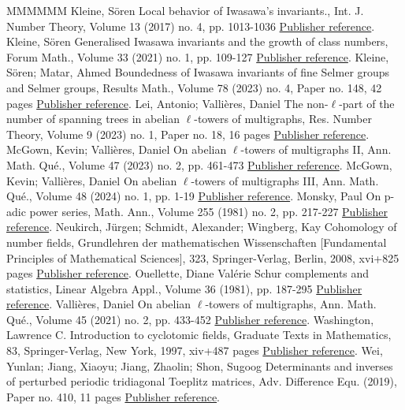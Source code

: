 \documentclass[11pt]{article}
\theoremstyle{definition}
\numberwithin{equation}{section}
\begin{document}
\begin{thebibliography}{MMMMMM}
 Kleine, Sören Local behavior of Iwasawa’s invariants., Int. J. Number Theory, Volume 13 (2017) no. 4, pp. 1013-1036 \href{https://alco.centre-mersenne.org/articles/10.5802/alco.366/#local_beh}{Publisher reference}.
 Kleine, Sören Generalised Iwasawa invariants and the growth of class numbers, Forum Math., Volume 33 (2021) no. 1, pp. 109-127 \href{https://alco.centre-mersenne.org/articles/10.5802/alco.366/#local_max}{Publisher reference}.
 Kleine, Sören; Matar, Ahmed Boundedness of Iwasawa invariants of fine Selmer groups and Selmer groups, Results Math., Volume 78 (2023) no. 4, Paper no. 148, 42 pages \href{https://alco.centre-mersenne.org/articles/10.5802/alco.366/#kleine-matar}{Publisher reference}.
 Lei, Antonio; Vallières, Daniel The non-\(\ell\)-part of the number of spanning trees in abelian \(\ell\)-towers of multigraphs, Res. Number Theory, Volume 9 (2023) no. 1, Paper no. 18, 16 pages \href{https://alco.centre-mersenne.org/articles/10.5802/alco.366/#vallieres-lei}{Publisher reference}.
 McGown, Kevin; Vallières, Daniel On abelian \(\ell\)-towers of multigraphs II, Ann. Math. Qué., Volume 47 (2023) no. 2, pp. 461-473 \href{https://alco.centre-mersenne.org/articles/10.5802/alco.366/#vallieres2}{Publisher reference}.
 McGown, Kevin; Vallières, Daniel On abelian \(\ell\)-towers of multigraphs III, Ann. Math. Qué., Volume 48 (2024) no. 1, pp. 1-19 \href{https://alco.centre-mersenne.org/articles/10.5802/alco.366/#vallieres3}{Publisher reference}.
 Monsky, Paul On p-adic power series, Math. Ann., Volume 255 (1981) no. 2, pp. 217-227 \href{https://alco.centre-mersenne.org/articles/10.5802/alco.366/#monsky}{Publisher reference}.
 Neukirch, Jürgen; Schmidt, Alexander; Wingberg, Kay Cohomology of number fields, Grundlehren der mathematischen Wissenschaften [Fundamental Principles of Mathematical Sciences], 323, Springer-Verlag, Berlin, 2008, xvi+825 pages \href{https://alco.centre-mersenne.org/articles/10.5802/alco.366/#nsw}{Publisher reference}.
 Ouellette, Diane Valérie Schur complements and statistics, Linear Algebra Appl., Volume 36 (1981), pp. 187-295 \href{https://alco.centre-mersenne.org/articles/10.5802/alco.366/#Ouellette}{Publisher reference}.
 Vallières, Daniel On abelian \(\ell\)-towers of multigraphs, Ann. Math. Qué., Volume 45 (2021) no. 2, pp. 433-452 \href{https://alco.centre-mersenne.org/articles/10.5802/alco.366/#vallieres1}{Publisher reference}.
 Washington, Lawrence C. Introduction to cyclotomic fields, Graduate Texts in Mathematics, 83, Springer-Verlag, New York, 1997, xiv+487 pages \href{https://alco.centre-mersenne.org/articles/10.5802/alco.366/#wash}{Publisher reference}.
 Wei, Yunlan; Jiang, Xiaoyu; Jiang, Zhaolin; Shon, Sugoog Determinants and inverses of perturbed periodic tridiagonal Toeplitz matrices, Adv. Difference Equ. (2019), Paper no. 410, 11 pages \href{https://alco.centre-mersenne.org/articles/10.5802/alco.366/#wei}{Publisher reference}.
\end{thebibliography}
\end{document}
